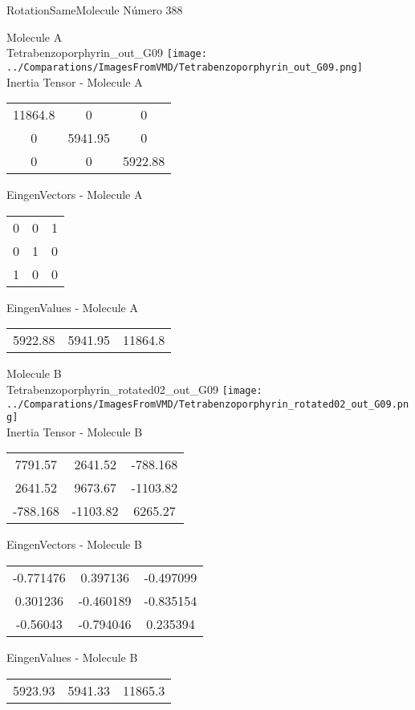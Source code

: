  \newpage

\vtab[-2cm]
\begin{center}
{\large RotationSameMolecule \tab Número 388}
\end{center}
\begin{multicols}{2}
\begin{center}

Molecule A \\ 
Tetrabenzoporphyrin\_out\_G09
\texttt{[image: ../Comparations/ImagesFromVMD/Tetrabenzoporphyrin\_out\_G09.png]}
\\
Inertia Tensor - Molecule A \\
\vtab

\begin{tabular}{|c c c|}
11864.8	 & 	0	 & 	0	 \\
0	 & 	5941.95	 & 	0	 \\
0	 & 	0	 & 	5922.88
\end{tabular}

\vtab
 EingenVectors - Molecule A     \\
\vtab
\begin{tabular}{|c c c|}
0	 & 	0	 & 	1	 \\
0	 & 	1	 & 	0	 \\
1	 & 	0	 & 	0
\end{tabular}

\vtab
 EingenValues - Molecule A     \\
\vtab
\begin{tabular}{|c c c|}
5922.88	 & 	5941.95	 & 	11864.8	 \\
\end{tabular}
\columnbreak

Molecule B \\ 
Tetrabenzoporphyrin\_rotated02\_out\_G09
\texttt{[image: ../Comparations/ImagesFromVMD/Tetrabenzoporphyrin\_rotated02\_out\_G09.png]}
\\
Inertia Tensor - Molecule B \\
\vtab

\begin{tabular}{|c c c|}
7791.57	 & 	2641.52	 & 	-788.168	 \\
2641.52	 & 	9673.67	 & 	-1103.82	 \\
-788.168	 & 	-1103.82	 & 	6265.27
\end{tabular}

\vtab
 EingenVectors - Molecule B     \\
\vtab
\begin{tabular}{|c c c|}
-0.771476	 & 	0.397136	 & 	-0.497099	 \\
0.301236	 & 	-0.460189	 & 	-0.835154	 \\
-0.56043	 & 	-0.794046	 & 	0.235394
\end{tabular}

\vtab
 EingenValues - Molecule B     \\
\vtab
\begin{tabular}{|c c c|}
5923.93	 & 	5941.33	 & 	11865.3	 \\
\end{tabular}

\end{center}
\end{multicols}
